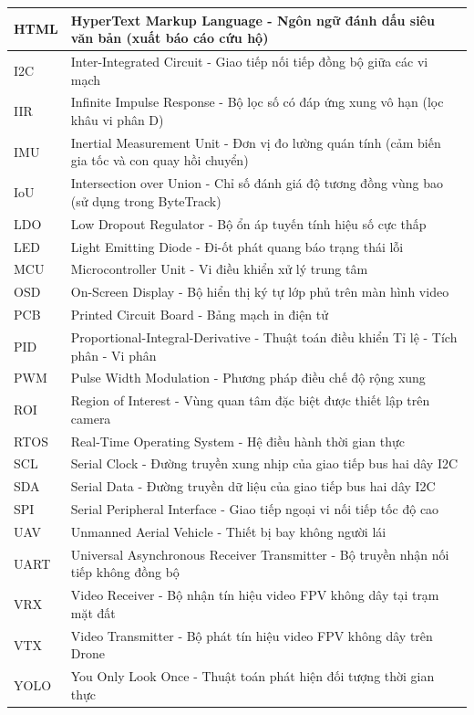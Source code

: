 \begin{center}
\begin{longtable}{|l|p{11.5cm}|}
HTML & HyperText Markup Language - Ngôn ngữ đánh dấu siêu văn bản (xuất báo cáo cứu hộ) \\ \hline
I2C & Inter-Integrated Circuit - Giao tiếp nối tiếp đồng bộ giữa các vi mạch \\ \hline
IIR & Infinite Impulse Response - Bộ lọc số có đáp ứng xung vô hạn (lọc khâu vi phân D) \\ \hline
IMU & Inertial Measurement Unit - Đơn vị đo lường quán tính (cảm biến gia tốc và con quay hồi chuyển) \\ \hline
IoU & Intersection over Union - Chỉ số đánh giá độ tương đồng vùng bao (sử dụng trong ByteTrack) \\ \hline
LDO & Low Dropout Regulator - Bộ ổn áp tuyến tính hiệu số cực thấp \\ \hline
LED & Light Emitting Diode - Đi-ốt phát quang báo trạng thái lỗi \\ \hline
MCU & Microcontroller Unit - Vi điều khiển xử lý trung tâm \\ \hline
OSD & On-Screen Display - Bộ hiển thị ký tự lớp phủ trên màn hình video \\ \hline
PCB & Printed Circuit Board - Bảng mạch in điện tử \\ \hline
PID & Proportional-Integral-Derivative - Thuật toán điều khiển Tỉ lệ - Tích phân - Vi phân \\ \hline
PWM & Pulse Width Modulation - Phương pháp điều chế độ rộng xung \\ \hline
ROI & Region of Interest - Vùng quan tâm đặc biệt được thiết lập trên camera \\ \hline
RTOS & Real-Time Operating System - Hệ điều hành thời gian thực \\ \hline
SCL & Serial Clock - Đường truyền xung nhịp của giao tiếp bus hai dây I2C \\ \hline
SDA & Serial Data - Đường truyền dữ liệu của giao tiếp bus hai dây I2C \\ \hline
SPI & Serial Peripheral Interface - Giao tiếp ngoại vi nối tiếp tốc độ cao \\ \hline
UAV & Unmanned Aerial Vehicle - Thiết bị bay không người lái \\ \hline
UART & Universal Asynchronous Receiver Transmitter - Bộ truyền nhận nối tiếp không đồng bộ \\ \hline
VRX & Video Receiver - Bộ nhận tín hiệu video FPV không dây tại trạm mặt đất \\ \hline
VTX & Video Transmitter - Bộ phát tín hiệu video FPV không dây trên Drone \\ \hline
YOLO & You Only Look Once - Thuật toán phát hiện đối tượng thời gian thực \\ \hline
\end{longtable}
\end{center}
